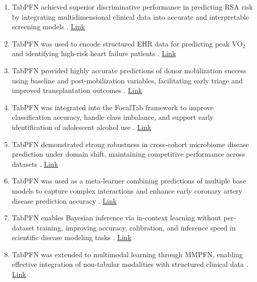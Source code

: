 \begin{enumerate}
\item TabPFN achieved superior discriminative performance in predicting RSA risk by integrating multidimensional clinical data into accurate and interpretable screening models \cite{chen2026multidimensional}. \href{https://doi.org/10.3389/fimmu.2026.1774359}{Link}

\item TabPFN was used to encode structured EHR data for predicting peak VO$_2$ and identifying high-risk heart failure patients \cite{huang2026multimodal}. \href{https://doi.org/10.1038/s41746-026-02493-w}{Link}

\item TabPFN provided highly accurate predictions of donor mobilization success using baseline and post-mobilization variables, facilitating early triage and improved transplantation outcomes \cite{adil2026deep}. \href{https://doi.org/10.1016/j.jtct.2026.02.016}{Link}

\item TabPFN was integrated into the FocalTab framework to improve classification accuracy, handle class imbalance, and support early identification of adolescent alcohol use \cite{liu2026classification}. \href{https://doi.org/10.64898/2026.02.24.26347002}{Link}

\item TabPFN demonstrated strong robustness in cross-cohort microbiome disease prediction under domain shift, maintaining competitive performance across datasets \cite{mu2026systematic}. \href{https://doi.org/10.21203/rs.3.rs-8912605/v1}{Link}

\item TabPFN was used as a meta-learner combining predictions of multiple base models to capture complex interactions and enhance early coronary artery disease prediction accuracy \cite{papakyriakopoulos2026heart}. \href{https://doi.org/10.21203/rs.3.rs-8239358/v1}{Link}

\item TabPFN enables Bayesian inference via in-context learning without per-dataset training, improving accuracy, calibration, and inference speed in scientific disease modeling tasks \cite{dinnage2026niche}. \href{https://doi.org/10.32942/x2vq10}{Link}

\item TabPFN was extended to multimodal learning through MMPFN, enabling effective integration of non-tabular modalities with structured clinical data \cite{kim2026multimodalpfn}. \href{http://arxiv.org/abs/2602.20223v2}{Link}


\end{enumerate}
